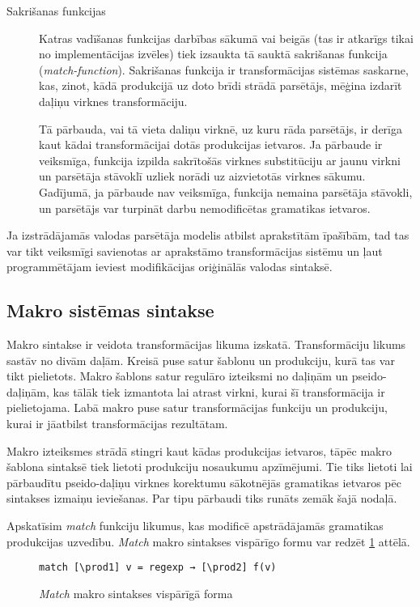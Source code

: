 \begin{description}
\item[Sakrišanas funkcijas]
Katras vadīšanas funkcijas darbības sākumā vai beigās (tas ir atkarīgs tikai no implementācijas izvēles) tiek izsaukta tā sauktā sakrišanas funkcija (\emph{match-function}). Sakrišanas funkcija ir transformācijas sistēmas saskarne, kas, zinot, kādā produkcijā uz doto brīdi strādā parsētājs, mēģina izdarīt daļiņu virknes transformāciju.

Tā pārbauda, vai tā vieta daliņu virknē, uz kuru rāda parsētājs, ir derīga kaut kādai transformācijai dotās produkcijas ietvaros. Ja pārbaude ir veiksmīga, funkcija izpilda sakrītošās virknes substitūciju ar jaunu virkni un parsētāja stāvoklī uzliek norādi uz aizvietotās virknes sākumu. Gadījumā,  ja pārbaude nav veiksmīga, funkcija nemaina parsētāja stāvokli, un parsētājs var turpināt darbu nemodificētas gramatikas ietvaros.
\end{description}

Ja izstrādājamās valodas parsētāja modelis atbilst aprakstītām īpašībām, tad tas var tikt veiksmīgi savienotas ar aprakstāmo transformācijas sistēmu un ļaut programmētājam ieviest modifikācijas oriģinālās valodas sintaksē.

\subsection{\label{sbs:sys_macrosyntax}Makro sistēmas sintakse}

Makro sintakse ir veidota transformācijas likuma izskatā. Transformāciju likums sastāv no divām daļām. Kreisā puse satur šablonu un produkciju, kurā tas var tikt pielietots. Makro šablons satur regulāro izteiksmi no daļiņām un pseido-daļiņām, kas tālāk tiek izmantota lai atrast virkni, kurai šī transformācija ir pielietojama. Labā makro puse satur transformācijas funkciju un produkciju, kurai ir jāatbilst transformācijas rezultātam.

Makro izteiksmes strādā stingri kaut kādas produkcijas ietvaros, tāpēc makro šablona sintaksē tiek lietoti produkciju nosaukumu apzīmējumi. Tie tiks lietoti lai pārbaudītu pseido-daļiņu virknes korektumu sākotnējās gramatikas ietvaros pēc sintakses izmaiņu ieviešanas. Par tipu pārbaudi tiks runāts zemāk šajā nodaļā.

Apskatīsim \textit{match} funkciju likumus, kas modificē apstrādājamās gramatikas produkcijas uzvedību. \emph{Match} makro sintakses vispārīgo formu var redzēt \ref{fig:matchsyntax} attēlā.

\begin{figure}[h!]
\begin{verbatim}
match [\prod1] v = regexp → [\prod2] f(v)
\end{verbatim}
\caption{\label{fig:matchsyntax}\emph{Match} makro sintakses vispārīgā forma}
\end{figure}

